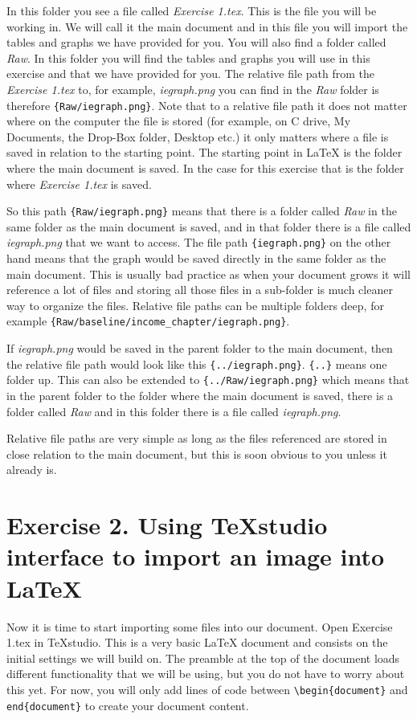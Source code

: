 \documentclass[12pts]{report}
\begin{document}
In this folder you see a file called \emph{Exercise 1.tex}. This is the file you will be working in. We will call it the main document and in this file you will import the tables and graphs we have provided for you. You will also find a folder called \emph{Raw}. In this folder you will find the tables and graphs you will use in this exercise and that we have provided for you. The relative file path from the \emph{Exercise 1.tex} to, for example, \emph{iegraph.png} you can find in the \emph{Raw} folder is therefore \verb|{Raw/iegraph.png}|. Note that to a relative file path it does not matter where on the computer the file is stored (for example, on C drive, My Documents, the Drop-Box folder, Desktop etc.) it only matters where a file is saved in relation to the starting point. The starting point in {\LaTeX} is the folder where the main document is saved. In the case for this exercise that is the folder where \emph{Exercise 1.tex} is saved.

So this path \verb|{Raw/iegraph.png}| means that there is a folder called \emph{Raw} in the same folder as the main document is saved, and in that folder there is a file called \emph{iegraph.png} that we want to access. The file path \verb|{iegraph.png}| on the other hand means that the graph would be saved directly in the same folder as the main document. This is usually bad practice as when your document grows it will reference a lot of files and storing all those files in a sub-folder is much cleaner way to organize the files. Relative file paths can be multiple folders deep, for example \verb|{Raw/baseline/income_chapter/iegraph.png}|. 

If \emph{iegraph.png} would be saved in the parent folder to the main document, then the relative file path would look like this \verb|{../iegraph.png}|. \verb|{..}| means one folder up. This can also be extended to \verb|{../Raw/iegraph.png}| which means that in the parent folder to the folder where the main document is saved, there is a folder called \emph{Raw} and in this folder there is a file called \emph{iegraph.png}.

Relative file paths are very simple as long as the files referenced are stored in close relation to the main document, but this is soon obvious to you unless it already is.

\section*{Exercise 2. Using TeXstudio interface to import an image into \LaTeX}
Now it is time to start importing some files into our document. Open Exercise 1.tex in TeXstudio. This is a very basic {\LaTeX} document and consists on the initial settings we will build on. The preamble at the top of the document loads different functionality that we will be using, but you do not have to worry about this yet. For now, you will only add lines of code between \verb|\begin{document}| and \verb|end{document}| to create your document content.
\end{document}
